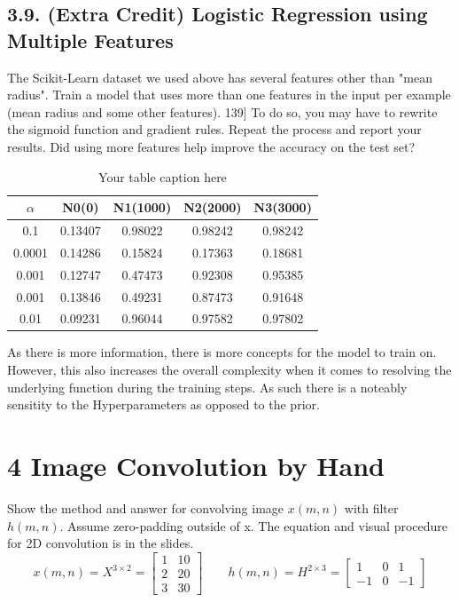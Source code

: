 \documentclass[11pt]{article}
\theoremstyle{plain}
\begin{document}
\subsection*{3.9. (Extra Credit) Logistic Regression using Multiple Features }
The Scikit-Learn dataset we used above has several features other than "mean radius".  Train a model that uses more than one features in the input per example (mean radius and some other features).  139] To do so, you may have to rewrite the sigmoid function and gradient rules.  Repeat the process and report your results. Did using more features help improve the accuracy on the test set?
\begin{table}[h!]
	\centering
	\begin{tabular}{|c|c|c|c|c|}
		\hline
		\textbf{$\alpha$} & \textbf{N0(0)} & \textbf{N1(1000)} & \textbf{N2(2000)} & \textbf{N3(3000)} \\ \hline
		0.1               & 0.13407        & 0.98022           & 0.98242           & 0.98242           \\ \hline
		0.0001            & 0.14286        & 0.15824           & 0.17363           & 0.18681           \\ \hline
		0.001             & 0.12747        & 0.47473           & 0.92308           & 0.95385           \\ \hline
		0.001             & 0.13846        & 0.49231           & 0.87473           & 0.91648           \\ \hline
		0.01              & 0.09231        & 0.96044           & 0.97582           & 0.97802           \\ \hline
	\end{tabular}
	\caption{Your table caption here}
	\label{tab:alpha_results}
\end{table}
As there is more information, there is more concepts for the model to train on. However, this also increases the overall complexity when it comes to resolving the underlying function during the training steps. As such there is a noteably sensitity to the Hyperparameters as opposed to the prior.

\section*{4 Image Convolution by Hand   }

Show the method and answer for convolving image $x(m,n)$ with filter $h(m,n)$. Assume zero-padding outside of x.  The equation and visual procedure for 2D convolution is in the slides.
\[
	x(m,n) = X^{3 \times 2}  =
	\begin{bmatrix}
		1 & 10 \\
		2 & 20 \\
		3 & 30
	\end{bmatrix} \quad \quad
	h(m,n)  = H^{2 \times 3} =
	\begin{bmatrix}
		1  & 0 & 1  \\
		-1 & 0 & -1
	\end{bmatrix}
\]
\end{document}
